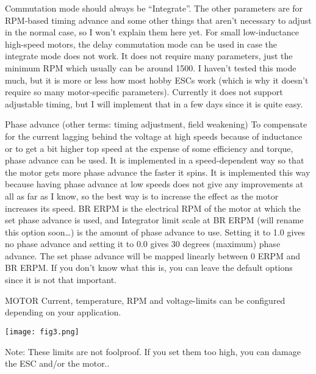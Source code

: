 \documentclass[11pt]{article}
\begin{document}
Commutation mode should always be “Integrate”.\newline
The other parameters are for RPM-based timing advance and some other things that aren’t necessary to adjust in the normal case, so I won’t explain them here yet.\newline
For small low-inductance high-speed motors, the delay commutation mode can be used in case the integrate mode does not work. It does not require many parameters, just the minimum RPM which usually can be around 1500. I haven’t tested this mode much, but it is more or less how most hobby ESCs work (which is why it doesn’t require so many motor-specific parameters). Currently it does not support adjustable timing, but I will implement that in a few days since it is quite easy.\newline

Phase advance (other terms: timing adjustment, field weakening)\newline
To compensate for the current lagging behind the voltage at high speeds because of inductance or to get a bit higher top speed at the expense of some efficiency and torque, phase advance can be used. It is implemented in a speed-dependent way so that the motor gets more phase advance the faster it spins. It is implemented this way because having phase advance at low speeds does not give any improvements at all as far as I know, so the best way is to increase the effect as the motor increases its speed. BR ERPM is the electrical RPM of the motor at which the set phase advance is used, and Integrator limit scale at BR ERPM (will rename this option soon…) is the amount of phase advance to use. Setting it to 1.0 gives no phase advance and setting it to 0.0 gives 30 degrees (maximum) phase advance. The set phase advance will be mapped linearly between 0 ERPM and BR ERPM. If you don’t know what this is, you can leave the default options since it is not that important.\newline

MOTOR
Current, temperature, RPM and voltage-limits can be configured depending on your application.\newline
\begin {center}
\texttt{[image: fig3.png]}\newline

\end{center}

Note: These limits are not foolproof. If you set them too high, you can damage the ESC and/or the motor..\newline
\end{document}
